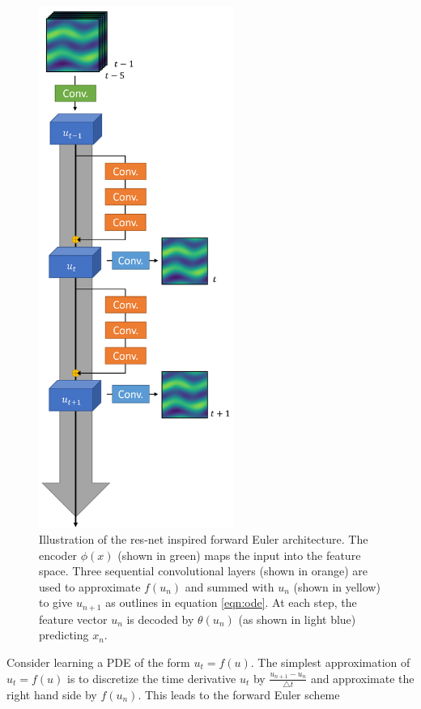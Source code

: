 \documentclass[12pt]{article}
\theoremstyle{plain}
\theoremstyle{remark}
\theoremstyle{definition}
\begin{document}
    \begin{figure}
        \centering
        \begin{minipage}[c]{\textwidth}
            \centering
            \includegraphics[width=2.5in]{pde_arch}
            \caption{Illustration of the res-net inspired forward Euler architecture. The encoder $\phi(x)$ (shown in green) maps the input into the feature space. Three sequential convolutional layers (shown in orange) are used to approximate $f(u_n)$ and summed with $u_n$ (shown in yellow) to give $u_{n+1}$ as outlines in equation \ref{eqn:ode}. At each step, the feature vector $u_n$ is decoded by $\theta(u_n)$ (as shown in light blue) predicting $x_n$. }
            \label{fig:pdearch}
        \end{minipage}
    \end{figure}


    Consider learning a PDE of the form $u_t = f(u)$. The simplest approximation of $u_t = f(u)$ is to discretize the time derivative $u_t$ by $\frac{u_{n+1} - u_n}{\bigtriangleup t}$ and approximate the right hand side by $f(u_n)$. This leads to the forward Euler scheme
\end{document}
